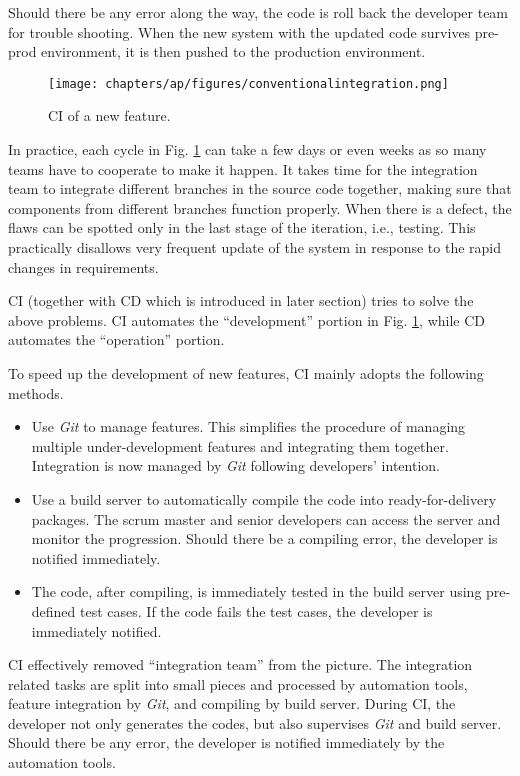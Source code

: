 Should there be any error along the way, the code is roll back the developer team for trouble shooting. When the new system with the updated code survives pre-prod environment, it is then pushed to the production environment.
\begin{figure}[htbp]
	\centering
	\texttt{[image: chapters/ap/figures/conventionalintegration.png]}
	\caption{CI of a new feature.} \label{ch:cicd:fig:conventionalintegration}
\end{figure}

In practice, each cycle in Fig. \ref{ch:cicd:fig:conventionalintegration} can take a few days or even weeks as so many teams have to cooperate to make it happen. It takes time for the integration team to integrate different branches in the source code together, making sure that components from different branches function properly. When there is a defect, the flaws can be spotted only in the last stage of the iteration, i.e., testing. This practically disallows very frequent update of the system in response to the rapid changes in requirements.

CI (together with CD which is introduced in later section) tries to solve the above problems. CI automates the ``development'' portion in Fig. \ref{ch:cicd:fig:conventionalintegration}, while CD automates the ``operation'' portion.

To speed up the development of new features, CI mainly adopts the following methods.
\begin{itemize}
	\item Use \textit{Git} to manage features. This simplifies the procedure of managing multiple under-development features and integrating them together. Integration is now managed by \textit{Git} following developers' intention.
	\item Use a build server to automatically compile the code into ready-for-delivery packages. The scrum master and senior developers can access the server and monitor the progression. Should there be a compiling error, the developer is notified immediately.
	\item The code, after compiling, is immediately tested in the build server using pre-defined test cases. If the code fails the test cases, the developer is immediately notified.
\end{itemize}

CI effectively removed ``integration team'' from the picture. The integration related tasks are split into small pieces and processed by automation tools, feature integration by \textit{Git}, and compiling by build server. During CI, the developer not only generates the codes, but also supervises \textit{Git} and build server. Should there be any error, the developer is notified immediately by the automation tools.

